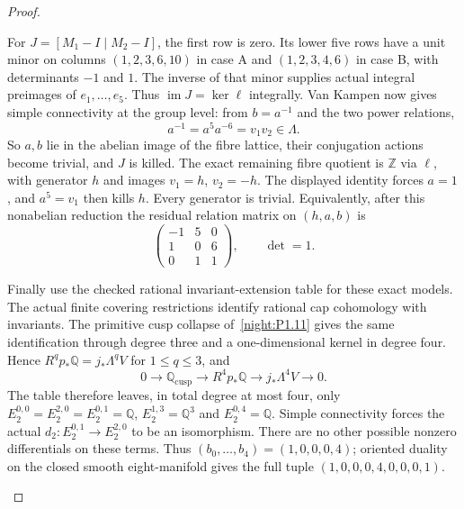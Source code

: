 \begin{proof}
\begin{enumerate}[label=\arabic*.]
For $J=[M_1-I\mid M_2-I]$, the first row is zero. Its lower five
rows have a unit minor on columns $(1,2,3,6,10)$ in case A and
$(1,2,3,4,6)$ in case B, with determinants $-1$ and $1$.
The inverse of that minor supplies actual integral preimages of
$e_1,\ldots,e_5$. Thus
$\operatorname{im}J=\ker\ell$ integrally. Van Kampen now gives
simple connectivity at the group level: from $b=a^{-1}$ and the
two power relations,
\[
 a^{-1}=a^5a^{-6}=v_1v_2\in\Lambda.
\]
So $a,b$ lie in the abelian image of the fibre lattice, their
conjugation actions become trivial, and $J$ is killed. The exact
remaining fibre quotient is $\mathbb Z$ via $\ell$, with generator
$h$ and images $v_1=h$, $v_2=-h$. The displayed identity forces
$a=1$, and $a^5=v_1$ then kills $h$. Every generator is trivial.
Equivalently, after this nonabelian reduction the residual relation
matrix on $(h,a,b)$ is
\[
 \begin{pmatrix}-1&5&0\\1&0&6\\0&1&1\end{pmatrix},
 \qquad\det=1.
\]

Finally use the checked rational invariant-extension table for these
exact models. The actual finite covering restrictions identify
rational cap cohomology with invariants. The primitive cusp collapse
of~\ref{night:P1.11} gives the same identification through degree
three and a one-dimensional kernel in degree four. Hence
$R^q p_*\mathbb Q=j_*\Lambda^qV$ for $1\le q\le3$, and
\[
 0\longrightarrow\mathbb Q_{\mathrm{cusp}}
 \longrightarrow R^4p_*\mathbb Q
 \longrightarrow j_*\Lambda^4V\longrightarrow0.
\]
The table therefore leaves, in total degree at most four, only
$E_2^{0,0}=E_2^{2,0}=E_2^{0,1}=\mathbb Q$,
$E_2^{1,3}=\mathbb Q^3$ and $E_2^{0,4}=\mathbb Q$.
Simple connectivity forces the actual
$d_2:E_2^{0,1}\to E_2^{2,0}$ to be an isomorphism. There are no
other possible nonzero differentials on these terms. Thus
$(b_0,\ldots,b_4)=(1,0,0,0,4)$; oriented duality on the closed
smooth eight-manifold gives the full tuple
$(1,0,0,0,4,0,0,0,1)$.
\end{enumerate}
\end{proof}




